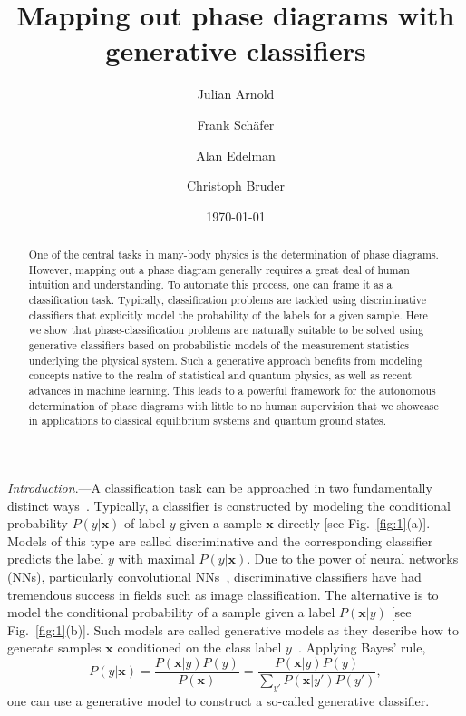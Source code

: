 \documentclass[twocolumn,aps,prl,superscriptaddress,tightlines,nofootinbib]{revtex4-2}
\begin{document}
\title{Mapping out phase diagrams with generative classifiers}
\author{Julian Arnold}
\author{Frank Sch\"afer}
\author{Alan Edelman}
 \author{Christoph Bruder}
\date{\today}

\begin{abstract}
One of the central tasks in many-body physics is the determination of phase diagrams. However, mapping out a phase diagram generally requires a great deal of human intuition and understanding. To automate this process, one can frame it as a classification task. Typically, classification problems are tackled using discriminative classifiers that explicitly model the probability of the labels for a given sample. Here we show that phase-classification problems are naturally suitable to be solved using generative classifiers based on probabilistic models of the measurement statistics underlying the physical system. Such a generative approach benefits from modeling concepts native to the realm of statistical and quantum physics, as well as recent advances in machine learning. This leads to a powerful framework for the autonomous determination of phase diagrams with little to no human supervision that we showcase in applications to classical equilibrium systems and quantum ground states.
\end{abstract}

\maketitle
\emph{Introduction}.---A classification task can be approached in two fundamentally distinct ways~\cite{ng:2001}. Typically, a classifier is constructed by modeling the conditional probability $P(y|\bm{x})$ of label $y$ given a sample $\bm{x}$ directly [see Fig.~\ref{fig:1}(a)]. Models of this type are called discriminative and the corresponding classifier predicts the label $y$ with maximal $P(y|\bm{x})$. Due to the power of neural networks (NNs), particularly convolutional NNs~\cite{krizhevsky:2012}, discriminative classifiers have had tremendous success in fields such as image classification. The alternative is to model the conditional probability of a sample given a label $P(\bm{x}|y)$ [see Fig.~\ref{fig:1}(b)]. Such models are called generative models as they describe how to generate samples $\bm{x}$ conditioned on the class label $y$~\cite{gen_vs_disc}. Applying Bayes' rule,
\begin{equation}\label{eq:Bayes_1}
    P(y|\bm{x}) = \frac{P(\bm{x}|y)P(y)}{P(\bm{x})} = \frac{P(\bm{x}|y)P(y)}{\sum_{y'} P(\bm{x}|y')P(y')},
\end{equation}
one can use a generative model to construct a so-called generative classifier.
\end{document}
